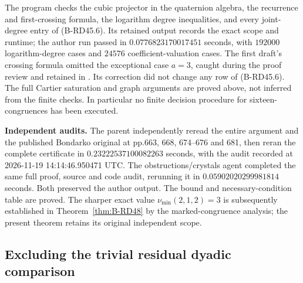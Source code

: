 \begin{remark}\label{auto:B:a2534788021e}

The program 
checks the cubic projector in the quaternion algebra, the
recurrence and first-crossing formula, the logarithm degree
inequalities, and every joint-degree entry of (B-RD45.6).
Its retained output records the exact scope and runtime; the
author run passed in $0.0776823170017451$ seconds, with
$192000$ logarithm-degree cases and $24576$ coefficient-valuation
cases. The first draft's crossing formula omitted the exceptional
case $a=3$, caught during the proof review and retained in
.
Its correction did not change any row of (B-RD45.6).
The full Cartier saturation and graph arguments are proved
above, not inferred from the finite checks. In particular
no finite decision procedure for sixteen-congruences has
been executed.
\end{remark}

\par\smallskip\noindent\textbf{Independent audits.}
The parent independently reread the entire argument and the published
Bondarko original at pp.663, 668, 674--676 and 681, then reran the
complete certificate in $0.23222537100082263$ seconds, with the
audit recorded at 2026-11-19 14:14:46.950471 UTC.
The obstructions/crystals agent completed the same full proof,
source and code audit, rerunning it in $0.05902020299981814$ seconds.
Both preserved the author output. The bound and necessary-condition
table are proved. The sharper exact value
$\nu_{\min}(2,1,2)=3$ is subsequently established in
Theorem~\ref{thm:B-RD48} by the marked-congruence analysis;
the present theorem retains its original independent scope.


\subsection{Excluding the trivial residual dyadic comparison}

